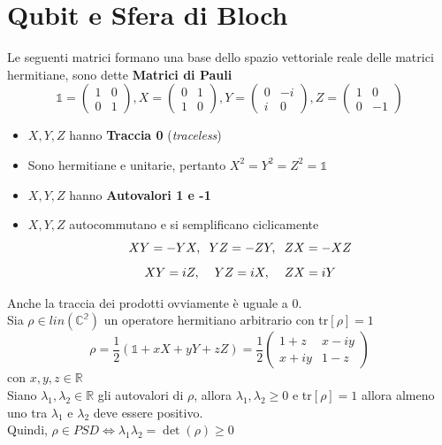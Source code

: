 \documentclass{report}
\begin{document}
\section{Qubit e Sfera di Bloch}
Le seguenti  matrici formano una base dello spazio vettoriale reale delle matrici hermitiane, sono dette \textbf{Matrici di Pauli}
$$
\mathbb{1}=
\begin{pmatrix}
    1 & 0\\
    0 & 1
\end{pmatrix}
, X =
\begin{pmatrix}
    0 & 1\\
    1 & 0
\end{pmatrix}
, Y=
\begin{pmatrix}
    0 & -i\\
    i & 0
\end{pmatrix}
, Z =
\begin{pmatrix}
    1 & 0 \\
    0 & -1
\end{pmatrix}
$$
\begin{itemize}
    \item $X,Y,Z$ hanno \textbf{Traccia 0} (\textit{traceless})
    \item Sono hermitiane e unitarie, pertanto $X^2=Y^2=Z^2=\mathbb{1}$
    \item $X,Y,Z$ hanno \textbf{Autovalori 1 e -1}
    \item $X,Y,Z$ autocommutano e si semplificano ciclicamente
    $$XY = -YX, \hspace{0.2cm} YZ = -ZY,  \hspace{0.2cm} ZX = -XZ$$
    $$XY = iZ, \hspace{0.4cm} YZ = iX,  \hspace{0.4cm} ZX = iY$$ 
\end{itemize}
Anche la traccia dei prodotti ovviamente è uguale a 0.
\medskip
\\Sia $\rho \in \textit{lin}(\mathbb{C^2})$ un operatore hermitiano arbitrario con tr$[\rho] = 1$
$$\rho = \frac{1}{2}\left( \mathbb{1} + xX + yY+zZ\right) = \frac{1}{2}
\begin{pmatrix}
    1+z & x-iy \\
    x+iy & 1-z
\end{pmatrix}$$
con $x,y,z\in \mathbb{R}$
\medskip
\\Siano $\lambda_1,\lambda_2 \in \mathbb{R}$ gli autovalori di $\rho$, allora $\lambda_1,\lambda_2 \ge 0$ e tr$[\rho]=1$
allora almeno uno tra $\lambda_1$ e $\lambda_2$ deve essere positivo.
\\Quindi, $\rho \in \textit{PSD} \Leftrightarrow \lambda_1\lambda_2=\det(\rho)\ge0$
\end{document}
